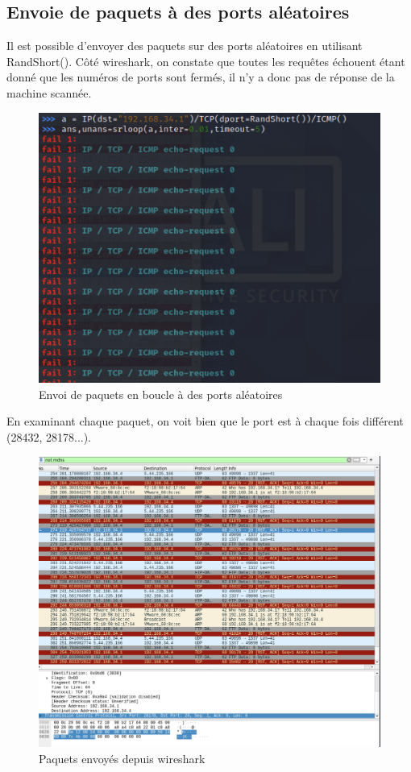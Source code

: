 \documentclass[12pt, oneside]{article}
\begin{document}
\subsection{Envoie de paquets à des ports aléatoires}
Il est possible d'envoyer des paquets sur des ports aléatoires en utilisant RandShort(). Côté wireshark, on constate que toutes les requêtes échouent étant donné que les numéros de ports sont fermés, il n'y a donc pas de réponse de la machine scannée. 
\begin{figure}[H]
\centering
\includegraphics[scale=0.4]{sendp3}
\caption{Envoi de paquets en boucle à des ports aléatoires}
\end{figure}
En examinant chaque paquet, on voit bien que le port est à chaque fois différent (28432, 28178...).
\begin{figure}[H]
\centering
\includegraphics[scale=0.4]{wire3}
\caption{Paquets envoyés depuis wireshark}
\end{figure}
\end{document}
